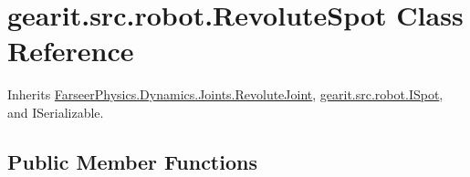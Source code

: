 \hypertarget{classgearit_1_1src_1_1robot_1_1_revolute_spot}{\section{gearit.\+src.\+robot.\+Revolute\+Spot Class Reference}
\label{classgearit_1_1src_1_1robot_1_1_revolute_spot}
}


Inherits \hyperlink{class_farseer_physics_1_1_dynamics_1_1_joints_1_1_revolute_joint}{Farseer\+Physics.\+Dynamics.\+Joints.\+Revolute\+Joint}, \hyperlink{interfacegearit_1_1src_1_1robot_1_1_i_spot}{gearit.\+src.\+robot.\+I\+Spot}, and I\+Serializable.

\subsection*{Public Member Functions}
